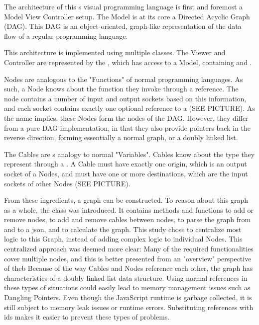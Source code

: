 The architecture of this \geofront{}s visual programming language is first and foremost a Model View Controller setup. The Model 
is at its core a Directed Acyclic Graph (DAG). 
This DAG is an object-oriented, graph-like representation of the data flow of a regular programming language. 

This architecture is implemented using multiple classes. The Viewer and Controller are represented by the , which has access to a  Model, containing  and . 

Nodes are analogous to the "Functions" of normal programming languages. 
As such, a Node knows about the function they invoke through a  reference. 
The node contains a number of input and output sockets based on this information, and each socket contains exactly one optional reference to a  (SEE PICTURE).  
As the name implies, these Nodes form the nodes of the DAG. However, they differ from a pure DAG implementation, in that they also provide pointers back in the reverse direction, forming essentially a normal graph, or a doubly linked list. 

The Cables are \geofront{}s analogy to normal "Variables". Cables know about the type they represent through a . A Cable must have exactly one origin, which is an output socket of a Nodes, and must have one or more destinations, which are the input sockets of other Nodes (SEE PICTURE).

From these ingredients, a graph can be constructed. 
To reason about this graph as a whole, the  class was introduced. 
It contains methods and functions to add or remove nodes, to add and remove cables between nodes, to parse the graph from and to a json, and to calculate the graph.  
This study chose to centralize most logic to this Graph, instead of adding complex logic to individual Nodes. 
This centralized approach was deemed more clear: Many of the required functionalities cover multiple nodes, and this is better presented from an "overview" perspective of theb 
Because of the way Cables and Nodes reference each other, the graph has characteristics of a doubly linked list data structure. Using normal references in these types of situations could easily lead to memory management issues such as Dangling Pointers. Even though the JavaScript runtime is garbage collected, it is still subject to memory leak issues or runtime errors. Substituting references with ids makes it easier to prevent these types of problems. 


